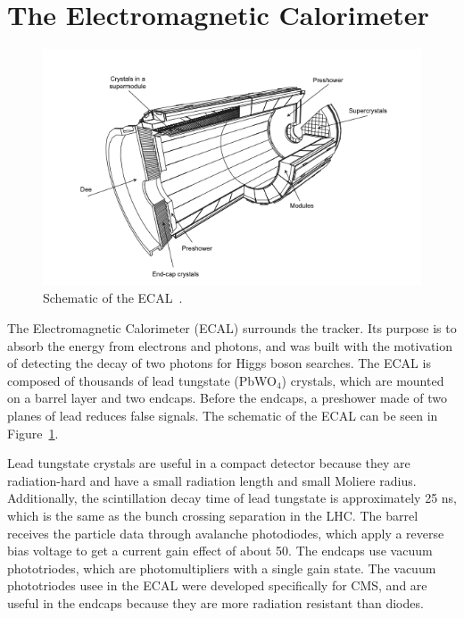 \vspace{-3pt}
\section{The Electromagnetic Calorimeter}\label{sec:ch3:ecal}

\begin{figure}[h]
\centering
\includegraphics[width=1.0\textwidth]{figures/ecal_replace.png}
\caption{Schematic of the ECAL~\cite{CMSExperiment}.}
\label{fig:ECAL}
\end{figure}


The Electromagnetic Calorimeter (ECAL) surrounds the tracker. Its purpose is to absorb the energy from electrons and photons, and was built with the motivation of detecting the decay of two photons for Higgs boson searches. The ECAL is composed of thousands of lead tungstate (PbWO$_4$) crystals, which are mounted on a barrel layer and two endcaps. Before the endcaps, a preshower made of two planes of lead reduces false signals. The schematic of the ECAL can be seen in Figure~\ref{fig:ECAL}.

Lead tungstate crystals are useful in a compact detector because they are radiation-hard and have a small radiation length and small Moliere radius. Additionally, the scintillation decay time of lead tungstate is approximately 25 ns, which is the same as the bunch crossing separation in the LHC. The barrel receives the particle data through avalanche photodiodes, which apply a reverse bias voltage to get a current gain effect of about 50. The endcaps use vacuum phototriodes, which are photomultipliers with a single gain state. The vacuum phototriodes usee in the ECAL were developed specifically for CMS, and are useful in the endcaps because they are more radiation resistant than diodes.

